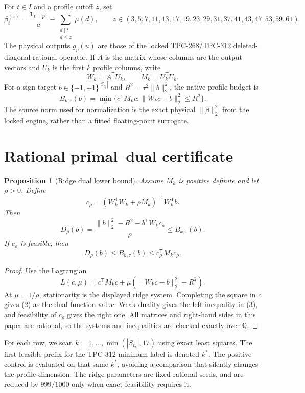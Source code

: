 \documentclass[10pt,a4paper]{article}
\newtheorem{proposition}{Proposition}
\begin{document}
For $t\in I$ and a profile cutoff $z$, set
\[
 \beta_t^{(z)}=\frac{\mathbf 1_{t=p^a}}{a}
 -\sum_{\substack{d\mid t\\d\leq z}}\mu(d),
 \qquad
 z\in(3,5,7,11,13,17,19,23,29,31,37,41,43,47,53,59,61).
\]
The physical outputs $g_p(u)$ are those of the locked TPC-268/TPC-312
deleted-diagonal rational operator.  If $A$ is the matrix whose columns are
the output vectors and $U_k$ is the first $k$ profile columns, write
\[
 W_k=A^{\mathsf T}U_k,\qquad M_k=U_k^{\mathsf T}U_k.
\]
For a sign target $b\in\{-1,+1\}^{|S_Q|}$ and
$R^2=\tau^2\|b\|_2^2$, the native profile budget is
\[
 B_{k,\tau}(b)=\min_c\{c^{\mathsf T}M_kc:
             \|W_kc-b\|_2^2\leq R^2\}.                 \tag{1}
\]
The source norm used for normalization is the exact physical
$\|\beta\|_2^2$ from the locked engine, rather than a fitted floating-point
surrogate.

\section{Rational primal--dual certificate}

\begin{proposition}[Ridge dual lower bound]
Assume $M_k$ is positive definite and let $\rho>0$.  Define
\[
 c_\rho=(W_k^{\mathsf T}W_k+\rho M_k)^{-1}W_k^{\mathsf T}b.
\]
Then
\[
 D_\rho(b)=
 \frac{\|b\|_2^2-R^2-b^{\mathsf T}W_kc_\rho}{\rho}
 \leq B_{k,\tau}(b).                                  \tag{2}
\]
If $c_\rho$ is feasible, then
\[
 D_\rho(b)\leq B_{k,\tau}(b)
 \leq c_\rho^{\mathsf T}M_kc_\rho.                   \tag{3}
\]
\end{proposition}

\begin{proof}
Use the Lagrangian
\[
 L(c,\mu)=c^{\mathsf T}M_kc+
 \mu(\|W_kc-b\|_2^2-R^2).
\]
At $\mu=1/\rho$, stationarity is the displayed ridge system.  Completing
the square in $c$ gives (2) as the dual function value.  Weak duality gives
the left inequality in (3), and feasibility of $c_\rho$ gives the right one.
All matrices and right-hand sides in this paper are rational, so the
systems and inequalities are checked exactly over $\mathbb Q$.
\end{proof}

For each row, we scan $k=1,\ldots,\min(|S_Q|,17)$ using exact least squares.
The first feasible prefix for the TPC-312 minimum label is denoted $k^*$.
The positive control is evaluated on that same $k^*$, avoiding a comparison
that silently changes the profile dimension.  The ridge parameters are fixed
rational seeds, and are reduced by $999/1000$ only when exact feasibility
requires it.
\end{document}
